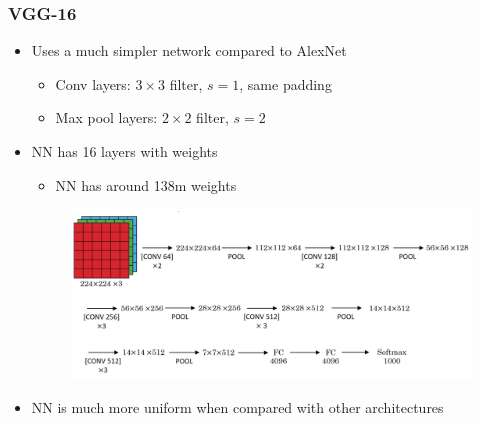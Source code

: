 \documentclass[12pt, letterpaper]{article}
\begin{document}
    \subsubsection{VGG-16}
    \begin{itemize}
        \item Uses a much simpler network compared to AlexNet
        \begin{itemize}
            \item Conv layers: $3\times 3$ filter, $s=1$, same padding
            \item Max pool layers: $2\times 2$ filter, $s=2$
        \end{itemize}
        \item NN has 16 layers with weights
        \begin{itemize}
            \item NN has around 138m weights
        \end{itemize}
        \begin{figure}[ht]
            \centering
            \includegraphics[width=16cm]{26.png}
        \end{figure}
        \item NN is much more uniform when compared with other architectures
    \end{itemize}
\end{document}
